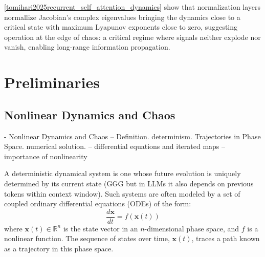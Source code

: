 \documentclass[a4paper,12pt]{article}
\begin{document}
\ref{tomihari2025recurrent_self_attention_dynamics} show that normalization layers normallize Jacobian's complex eigenvalues bringing the dynamics close to a critical state with maximum Lyapunov exponents close to zero, suggesting operation at the edge of chaos: a critical regime where signals neither explode nor vanish, enabling long-range information propagation.






\section{Preliminaries}


\subsection{Nonlinear Dynamics and Chaos}

- Nonlinear Dynamics and Chaos
-- Definition. determinism. Trajectories in Phase Space. numerical solution.
-- differential equations and iterated maps
-- importance of nonlinearity

A deterministic dynamical system is one whose future evolution is uniquely determined by its current state (GGG but in LLMs it also depends on previous tokens within context window). Such systems are often modeled by a set of coupled ordinary differential equations (ODEs) of the form:
\begin{equation}
    \frac{d\mathbf{x}}{dt} = f(\mathbf{x}(t))
\end{equation}
where $\mathbf{x}(t) \in \mathbb{R}^n$ is the state vector in an $n$-dimensional phase space, and $f$ is a nonlinear function. The sequence of states over time, $\mathbf{x}(t)$, traces a path known as a trajectory in this phase space.
\end{document}
